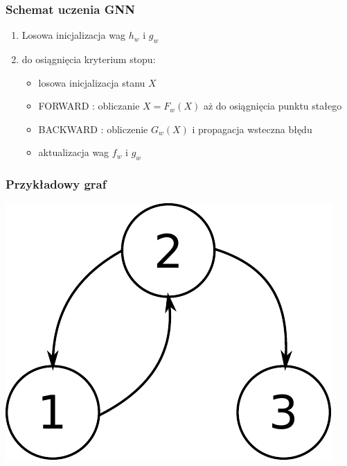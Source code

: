 \documentclass{beamer}
\begin{document}
\begin{frame}
\frametitle{Schemat uczenia GNN}
\begin{enumerate}
	\item Losowa inicjalizacja wag $h_w$ i $g_w$
	\item do osiągnięcia kryterium stopu:
	\begin{itemize}
		\item losowa inicjalizacja stanu $X$
		\item FORWARD : obliczanie $X = F_w(X)$ aż do osiągnięcia punktu stałego
		\item BACKWARD : obliczenie $G_w(X)$ i propagacja wsteczna błędu
		\item aktualizacja wag $f_w$ i $g_w$
	\end{itemize}
\end{enumerate}
\end{frame}

\begin{frame}
\frametitle{Przykładowy graf}
\begin{center}
	\includegraphics[scale=0.4]{img/graph}
\end{center}
\end{frame}
\end{document}
